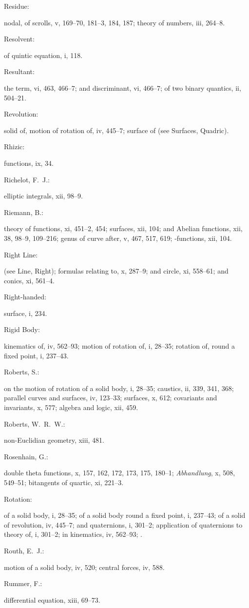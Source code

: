 \documentclass[11pt,a4paper]{book}
\providecommand{\V}[1]{#1}
\providecommand{\IndexEntry}[2]{#1\dotfill #2\par}
\begin{document}
\IndexEntry{Residue}: nodal, of scrolls, \V{v}, 169--70, 181--3, 184, 187; theory of numbers, \V{iii}, 264--8.

\IndexEntry{Resolvent}: of quintic equation, \V{i}, 118.

\IndexEntry{Resultant}: the term, \V{vi}, 463, 466--7; and discriminant, \V{vi}, 466--7; of two binary quantics, \V{ii}, 504--21.

\IndexEntry{Revolution}: solid of, motion of rotation of, \V{iv}, 445--7; surface of (see Surfaces, Quadric).

\IndexEntry{Rhizic}: functions, \V{ix}, 34.

\IndexEntry{Richelot, F.\ J.}: elliptic integrals, \V{xii}, 98--9.

\IndexEntry{Riemann, B.}: theory of functions, \V{xi}, 451--2, 454; surfaces, \V{xii}, 104; and Abelian functions, \V{xii}, 38, 98--9, 109--216; genus of curve after, \V{v}, 467, 517, 619; \vartheta-functions, \V{xii}, 104.

\IndexEntry{Right Line}: (see Line, Right); formulas relating to, \V{x}, 287--9; and circle, \V{xi}, 558--61; and conics, \V{xi}, 561--4.

\IndexEntry{Right-handed}: surface, \V{i}, 234.

\IndexEntry{Rigid Body}: kinematics of, \V{iv}, 562--93; motion of rotation of, \V{i}, 28--35; rotation of, round a fixed point, \V{i}, 237--43.

\IndexEntry{Roberts, S.}: on the motion of rotation of a solid body, \V{i}, 28--35; caustics, \V{ii}, 339, 341, 368; parallel curves and surfaces, \V{iv}, 123--33; surfaces, \V{x}, 612; covariants and invariants, \V{x}, 577; algebra and logic, \V{xii}, 459.

\IndexEntry{Roberts, W.\ R.\ W.}: non-Euclidian geometry, \V{xiii}, 481.

\IndexEntry{Rosenhain, G.}: double theta functions, \V{x}, 157, 162, 172, 173, 175, 180--1; \textit{Abhandlung}, \V{x}, 508, 549--51; bitangents of quartic, \V{xi}, 221--3.

\IndexEntry{Rotation}: of a solid body, \V{i}, 28--35; of a solid body round a fixed point, \V{i}, 237--43; of a solid of revolution, \V{iv}, 445--7; and quaternions, \V{i}, 301--2; application of quaternions to theory of, \V{i}, 301--2; in kinematics, \V{iv}, 562--93; .

\IndexEntry{Routh, E.\ J.}: motion of a solid body, \V{iv}, 520; central forces, \V{iv}, 588.

\IndexEntry{Rummer, F.}: differential equation, \V{xiii}, 69--73.
\end{document}

